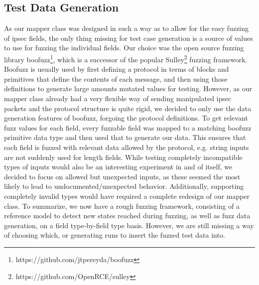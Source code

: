 \subsection{Test Data Generation} \label{subsec:data_gen}
As our mapper class was designed in such a way as to allow for the easy fuzzing of \ac{ipsec} fields, the only thing missing for test case generation is a source of values to use for fuzzing the individual fields. Our choice was the open source fuzzing library boofuzz\footnote{https://github.com/jtpereyda/boofuzz}, which is a successor of the popular Sulley\footnote{https://github.com/OpenRCE/sulley} fuzzing framework. Boofuzz is usually used by first defining a protocol in terms of blocks and primitives that define the contents of each message, and then using those definitions to generate large amounts mutated values for testing. However, as our mapper class already had a very flexible way of sending manipulated \ac{ipsec} packets and the protocol structure is quite rigid, we decided to only use the data generation features of boofuzz, forgoing the protocol definitions. To get relevant fuzz values for each field, every fuzzable field was mapped to a matching boofuzz primitive data type and then used that to generate our data. This ensures that each field is fuzzed with relevant data allowed by the protocol, e.g. string inputs are not suddenly used for length fields. While testing completely incompatible types of inputs would also be an interesting experiment in and of itself, we decided to focus on allowed but unexpected inputs, as these seemed the most likely to lead to undocumented/unexpected behavior. Additionally, supporting completely invalid types would have required a complete redesign of our mapper class. To summarize, we now have a rough fuzzing framework, consisting of a reference model to detect new states reached during fuzzing, as well as fuzz data generation, on a field type-by-field type basis. However, we are still missing a way of choosing which, or generating runs to insert the fuzzed test data into. 


